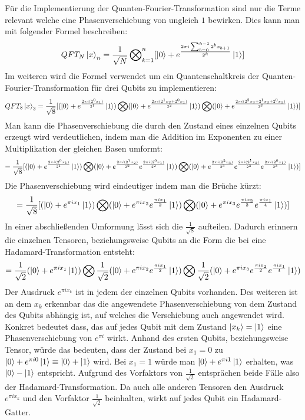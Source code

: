 Für die Implementierung der Quanten-Fourier-Transformation sind nur die Terme relevant
welche eine Phasenverschiebung von ungleich \(1\) bewirken.
Dies kann man mit folgender Formel beschreiben:
\[QFT_{N}\ket{x}_{n} = \frac{1}{\sqrt{N}}\operatorname{\bigotimes}_{k=1}^n [  \ket{0} + { e^{\frac{2 \pi i \sum_{b=0}^{k-1}2^b x_{b+1} }{2^k}}}\ket{1}]\] 
Im weiteren wird die Formel verwendet um ein Quantenschaltkreis der Quanten-Fourier-Transformation für drei Qubits zu implementieren:
\[QFT_{8}\ket{x}_{3} = \frac{1}{\sqrt{8}} [ (\ket{0} + { e^{\frac{2 \pi i (2^0x_1)}{2^1}}}\ket{1} ) \operatorname{\bigotimes}
( \ket{0} + { e^{\frac{2 \pi i (2^1x_2+2^0x_1)}{2^2}}}\ket{1} ) \operatorname{\bigotimes}
( \ket{0} + { e^{\frac{2 \pi i (2^{2}x_3 +2^1x_2+2^0x_1)}{2^3}}}\ket{1} ) ] \]
Man kann die Phasenverschiebung die durch den Zustand eines einzelnen Qubits erzeugt wird verdeutlichen,
indem man die Addition im Exponenten zu einer Multiplikation der gleichen Basen umformt:
\[ = \frac{1}{\sqrt{8}} [ (\ket{0} + { e^{\frac{2 \pi i (2^0x_1)}{2^1}}}\ket{1}) \operatorname{\bigotimes}
( \ket{0} + { e^{\frac{2 \pi i (2^1x_2)}{2^2}} e^{\frac{2 \pi i (2^0x_1)}{2^2}} }\ket{1} ) \operatorname{\bigotimes}
( \ket{0} + { e^{\frac{2 \pi i (2^{2}x_3)}{2^3}} e^{\frac{2 \pi i (2^1x_2)}{2^3}} e^{\frac{2 \pi i (2^0x_1)}{2^3}}  }\ket{1} ) ] \]
Die Phasenverschiebung wird eindeutiger indem man die Brüche kürzt:
\[ = \frac{1}{\sqrt{8}} [ ( \ket{0} + e^{\pi i x_1}\ket{1} ) \operatorname{\bigotimes}
( \ket{0} + { e^{\pi i x_2} e^{ \frac{ \pi i x_1}{2}} }\ket{1} ) \operatorname{\bigotimes}
( \ket{0} + { e^{\pi i x_3} e^{\frac{\pi i x_2}{2}} e^{ \frac{ \pi i x_1}{4}} }\ket{1} ) ] \]
In einer abschließenden Umformung lässt sich die \(\frac{1}{\sqrt8}\) aufteilen.
Dadurch erinnern die einzelnen Tensoren,
beziehungsweise Qubits an die Form die bei eine Hadamard-Transformation entsteht:
\[ = \frac{1}{\sqrt{2}}( \ket{0} + e^{\pi i x_1}\ket{1} ) \operatorname{\bigotimes}
\frac{1}{\sqrt{2}}( \ket{0} + { e^{\pi i x_2} e^{ \frac{ \pi i x_1}{2}} }\ket{1} ) \operatorname{\bigotimes}
\frac{1}{\sqrt{2}}( \ket{0} + { e^{\pi i x_3} e^{\frac{\pi i x_2}{2}} e^{ \frac{ \pi i x_1}{4}} }\ket{1} )  \]
Der Ausdruck \(e^{\pi i x_k}\) ist in jedem der einzelnen Qubits vorhanden.
Des weiteren ist an dem \(x_k\) erkennbar das die angewendete Phasenverschiebung von dem Zustand des Qubits abhängig ist,
auf welches die Verschiebung auch angewendet wird.
Konkret bedeutet dass, das auf jedes Qubit mit dem Zustand \(\ket{x_k} = \ket{1}\) eine Phasenverschiebung von \(e^{\pi i}\) wirkt.
Anhand des ersten Qubits, beziehungsweise Tensor, würde das bedeuten, dass der Zustand bei \(x_1 = 0\)
zu \(\ket{0} + e^{\pi i 0} \ket{1} \equiv \ket{0} + \ket{1}\) wird.
Bei \(x_1 = 1\) würde man \(\ket{0} + e^{\pi i 1} \ket{1}\) erhalten,
was \(\ket{0} - \ket{1}\) entspricht.
Aufgrund des Vorfaktors von \(\frac{1}{\sqrt{2}}\) entsprächen beide Fälle also der Hadamard-Transformation.
Da auch alle anderen Tensoren den Ausdruck \(e^{\pi i x_k}\) und den Vorfaktor \(\frac{1}{\sqrt{2}}\) beinhalten, wirkt auf jedes Qubit ein Hadamard-Gatter.

